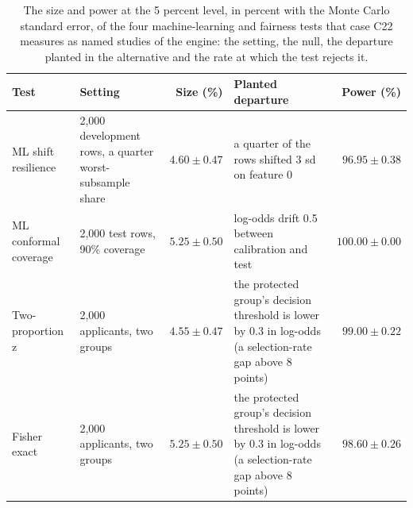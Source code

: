 \begin{table}[htbp]
\centering
\setlength{\tabcolsep}{3pt}
\footnotesize
\caption{The size and power at the 5 percent level, in percent with the Monte Carlo standard error, of the four machine-learning and fairness tests that case C22 measures as named studies of the engine: the setting, the null, the departure planted in the alternative and the rate at which the test rejects it.}
\label{tab:vt-other}
\begin{tabular}{lp{2.8cm}rp{4.4cm}r}
\toprule
Test & Setting & Size (\%) & Planted departure & Power (\%) \\
\midrule
ML shift resilience & 2,000 development rows, a quarter worst-subsample share & $4.60\pm0.47$ & a quarter of the rows shifted 3 sd on feature 0 & $96.95\pm0.38$ \\
ML conformal coverage & 2,000 test rows, 90\% coverage & $5.25\pm0.50$ & log-odds drift 0.5 between calibration and test & $100.00\pm0.00$ \\
Two-proportion z & 2,000 applicants, two groups & $4.55\pm0.47$ & the protected group's decision threshold is lower by 0.3 in log-odds (a selection-rate gap above 8 points) & $99.00\pm0.22$ \\
Fisher exact & 2,000 applicants, two groups & $5.25\pm0.50$ & the protected group's decision threshold is lower by 0.3 in log-odds (a selection-rate gap above 8 points) & $98.60\pm0.26$ \\
\bottomrule
\end{tabular}
\end{table}

